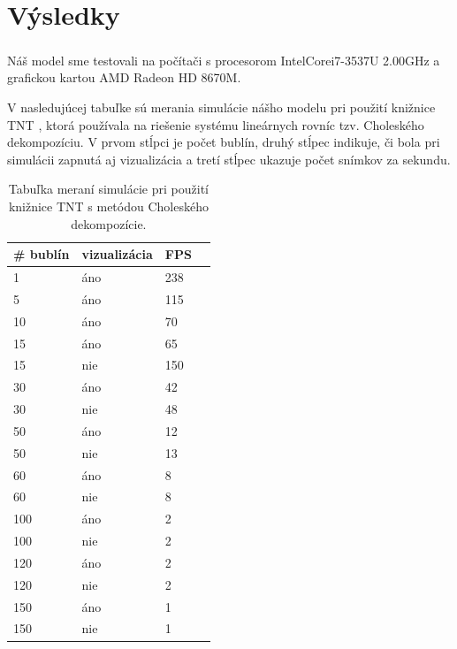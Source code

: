\chapter{Výsledky}\label{chap:results}

Náš model sme testovali na počítači s procesorom Intel\textsuperscript{\textregistered}Core\texttrademark i7-3537U 2.00GHz a grafickou kartou AMD Radeon HD 8670M.

\noindent
V nasledujúcej tabuľke sú merania simulácie nášho modelu pri použití knižnice TNT \cite{tnt}, ktorá používala na riešenie systému lineárnych rovníc tzv. Choleského dekompozíciu. V prvom stĺpci je počet bublín, druhý stĺpec indikuje, či bola pri simulácii zapnutá aj vizualizácia a tretí stĺpec ukazuje počet snímkov za sekundu.

\begin{table}[H]
	\caption{Tabuľka meraní simulácie pri použití knižnice TNT \cite{tnt} s metódou Choleského dekompozície.}
	\setlength{\extrarowheight}{2pt}
	\begin{tabularx}{\textwidth}{|X|X|X|X|}
		\hline
		\textbf{\# bublín} & \textbf{vizualizácia} & \textbf{FPS} \\ \hline
		1         & áno                   & 238          \\ \hline
		5         & áno                   & 115          \\ \hline
		10        & áno                   & 70          \\ \hline
		15        & áno                   & 65           \\ \hline
		15        & nie                   & 150          \\ \hline
		30        & áno                   & 42           \\ \hline
		30        & nie                   & 48           \\ \hline
		50        & áno                   & 12           \\ \hline
		50        & nie                   & 13           \\ \hline
		60        & áno                   & 8            \\ \hline
		60        & nie                   & 8            \\ \hline
		100       & áno                   & 2            \\ \hline
		100       & nie                   & 2            \\ \hline
		120       & áno                   & 2            \\ \hline
		120       & nie                   & 2            \\ \hline
		150       & áno                   & 1            \\ \hline
		150       & nie                   & 1            \\ \hline
	\end{tabularx}
\end{table}

